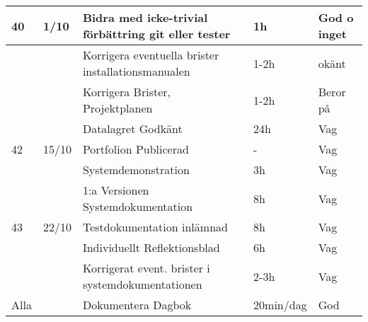 \documentclass{TDP003mall}
\begin{document}
\begin{tabularx}{\linewidth}{|l|l|X|l|l|}
	\hline                                                              
	40    & 1/10  & Bidra med icke-trivial förbättring git eller tester & 1h             & God o inget \\
	\hline                                                              
          &       & Korrigera eventuella brister installationsmanualen  & 1-2h           & okänt       \\
	\hline                                                              
          &       & Korrigera Brister, Projektplanen                    & 1-2h           & Beror på    \\
	\hline                                                              
          &       & Datalagret Godkänt                                  & 24h            & Vag         \\
	\hline                                                              
	42    & 15/10 & Portfolion Publicerad                               & -              & Vag         \\
	\hline                                                              
          &       & Systemdemonstration                                 & 3h             & Vag         \\
	\hline                                                              
          &       & 1:a Versionen Systemdokumentation                   & 8h             & Vag         \\
	\hline                                                              
	43    & 22/10 & Testdokumentation inlämnad                          & 8h             & Vag         \\
	\hline                                                              
          &       & Individuellt Reflektionsblad                        & 6h             & Vag         \\
	\hline                                                              
          &       & Korrigerat event. brister i systemdokumentationen   & 2-3h           & Vag         \\
	\hline                                                              
	\hline                                                              
	Alla  &       & Dokumentera Dagbok                                  & 20min/dag      & God         \\
	\hline
\end{tabularx}
\end{document}
